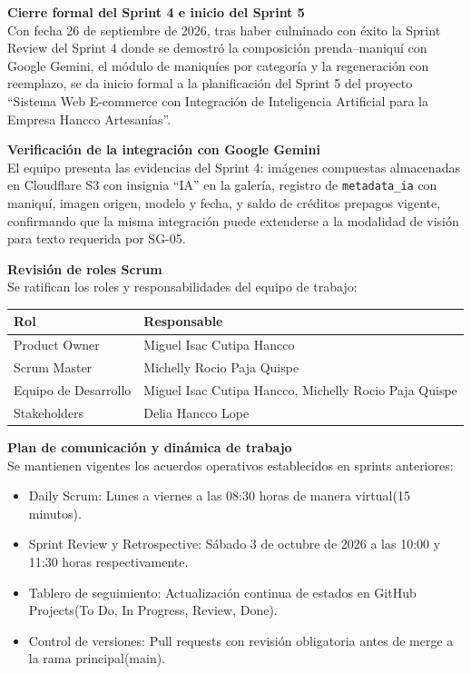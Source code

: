 \documentclass[12pt,a4paper]{article}
\begin{document}
\textbf{Cierre formal del Sprint 4 e inicio del Sprint 5}\\
Con fecha 26 de septiembre de 2026, tras haber culminado con éxito la Sprint Review del Sprint 4 donde se demostró la composición prenda--maniquí con Google Gemini, el módulo de maniquíes por categoría y la regeneración con reemplazo, se da inicio formal a la planificación del Sprint 5 del proyecto ``Sistema Web E-commerce con Integración de Inteligencia Artificial para la Empresa Hancco Artesanías''.

\textbf{Verificación de la integración con Google Gemini}\\
El equipo presenta las evidencias del Sprint 4: imágenes compuestas almacenadas en Cloudflare S3 con insignia ``IA'' en la galería, registro de \texttt{metadata\_ia} con maniquí, imagen origen, modelo y fecha, y saldo de créditos prepagos vigente, confirmando que la misma integración puede extenderse a la modalidad de visión para texto requerida por SG-05.

\textbf{Revisión de roles Scrum}\\
Se ratifican los roles y responsabilidades del equipo de trabajo:

\begin{center}
\small
\begin{tabularx}{\textwidth}{p{5cm} L}
\toprule
\textbf{Rol} & \textbf{Responsable} \\
\midrule
Product Owner & Miguel Isac Cutipa Hancco \\
Scrum Master & Michelly Rocio Paja Quispe \\
Equipo de Desarrollo & Miguel Isac Cutipa Hancco, Michelly Rocio Paja Quispe \\
Stakeholders & Delia Hancco Lope \\
\bottomrule
\end{tabularx}
\end{center}

\textbf{Plan de comunicación y dinámica de trabajo}\\
Se mantienen vigentes los acuerdos operativos establecidos en sprints anteriores:

\begin{itemize}
    \item Daily Scrum: Lunes a viernes a las 08:30 horas de manera virtual(15 minutos).
    \item Sprint Review y Retrospective: Sábado 3 de octubre de 2026 a las 10:00 y 11:30 horas respectivamente.
    \item Tablero de seguimiento: Actualización continua de estados en GitHub Projects(To Do, In Progress, Review, Done).
    \item Control de versiones: Pull requests con revisión obligatoria antes de merge a la rama principal(main).
\end{itemize}
\end{document}
